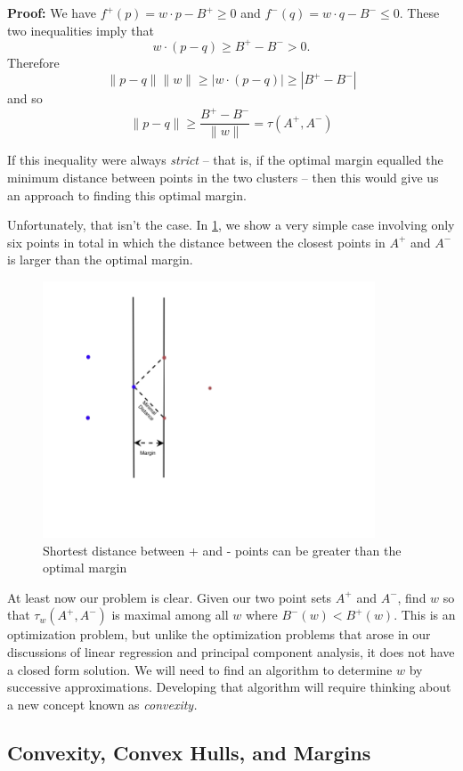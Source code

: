 \documentclass[
]{article}
\begin{document}
\textbf{Proof:} We have \(f^{+}(p) = w\cdot p - B^{+}\ge 0\) and
\(f^{-}(q) = w\cdot q -B^{-}\le 0\). These two inequalities imply that
\[
w\cdot (p-q)\ge B^{+}-B^{-}>0.
\] Therefore \[
\|p-q\|\|w\|\ge |w\cdot (p-q)|\ge |B^{+}-B^{-}|
\] and so \[
\|p-q\| \ge \frac{B^{+}-B^{-}}{\|w\|} = \tau(A^{+},A^{-})
\]

If this inequality were always \emph{strict} -- that is, if the optimal
margin equalled the minimum distance between points in the two clusters
-- then this would give us an approach to finding this optimal margin.

Unfortunately, that isn't the case. In \cref{fig:nonstrict}, we show a
very simple case involving only six points in total in which the
distance between the closest points in \(A^{+}\) and \(A^{-}\) is larger
than the optimal margin.

\begin{figure}
\hypertarget{fig:nonstrict}{%
\centering
\includegraphics[width=\textwidth,height=3in]{../img/margindistance2.png}
\caption{Shortest distance between + and - points can be greater than
the optimal margin}\label{fig:nonstrict}
}
\end{figure}

At least now our problem is clear. Given our two point sets \(A^{+}\)
and \(A^{-}\), find \(w\) so that \(\tau_{w}(A^{+},A^{-})\) is maximal
among all \(w\) where \(B^{-}(w)<B^{+}(w)\). This is an optimization
problem, but unlike the optimization problems that arose in our
discussions of linear regression and principal component analysis, it
does not have a closed form solution. We will need to find an algorithm
to determine \(w\) by successive approximations. Developing that
algorithm will require thinking about a new concept known as
\emph{convexity.}

\hypertarget{convexity-convex-hulls-and-margins}{%
\subsection{Convexity, Convex Hulls, and
Margins}\label{convexity-convex-hulls-and-margins}}
\end{document}
